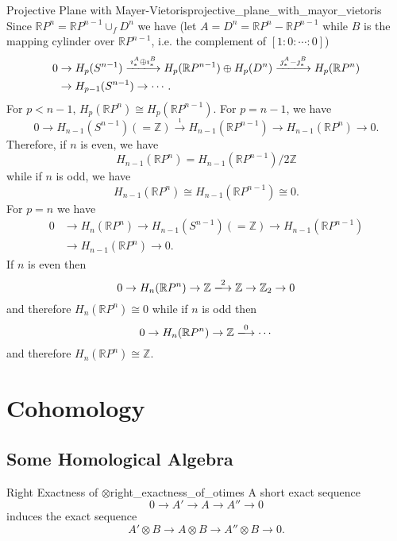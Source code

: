 \documentclass{article}
\begin{document}
\begin{example}{Projective Plane with Mayer-Vietoris}{projective_plane_with_mayor_vietoris}
    Since $\mathbb{R}P^n = \mathbb{R}P^{n-1} \cup_f D^n$ we have (let $A = D^n = \mathbb{R}P^n - \mathbb{R}P^{n-1}$ while $B$ is the mapping cylinder over $\mathbb{R}P^{n-1}$, i.e. the complement of $[1:0:\cdots:0]$)
    \begin{align*}
        0 &\rightarrow H_p(S^{n-1}) \xlongrightarrow{\imath^A_* \oplus \imath^B_*} H_p(\mathbb{R}P^{n-1}) \oplus H_p(D^n) \xlongrightarrow{\jmath^A_* - \jmath^B_*} H_p(\mathbb{R}P^n) \\
        & \rightarrow H_{p-1}(S^{n-1}) \rightarrow \cdots.
    \end{align*}
    For $p < n-1$, $H_p(\mathbb{R}P^n) \cong H_p(\mathbb{R}P^{n-1})$.
    For $p=n-1$, we have
    \[ 0 \rightarrow H_{n-1}(S^{n-1}) (=\mathbb{Z}) \xrightarrow{\imath} H_{n-1}(\mathbb{R}P^{n-1}) \rightarrow H_{n-1}(\mathbb{R}P^n) \rightarrow 0. \]
    Therefore, if $n$ is even, we have
    \[ H_{n-1}(\mathbb{R}P^n) = H_{n-1}(\mathbb{R}P^{n-1})/2\mathbb{Z} \]
    while if $n$ is odd, we have
    \[ H_{n-1}(\mathbb{R}P^n) \cong H_{n-1}(\mathbb{R}P^{n-1}) \cong 0. \]
    For $p=n$ we have
    \begin{align*}
        0 &\rightarrow H_n(\mathbb{R}P^n) \rightarrow H_{n-1}(S^{n-1})(=\mathbb{Z}) \rightarrow H_{n-1}(\mathbb{R}P^{n-1}) \\ &\rightarrow H_{n-1}(\mathbb{R}P^{n}) \rightarrow 0.
    \end{align*}
    If $n$ is even then
    \[ 0 \rightarrow H_n(\mathbb{R}P^n) \rightarrow \mathbb{Z} \xlongrightarrow{2} \mathbb{Z} \rightarrow \mathbb{Z}_2 \rightarrow 0 \]
    and therefore $H_n(\mathbb{R}P^n) \cong 0$ while if $n$ is odd then
    \[ 0 \rightarrow H_n(\mathbb{R}P^n) \rightarrow \mathbb{Z} \xlongrightarrow{0} \cdots \]
    and therefore $H_n(\mathbb{R}P^n) \cong \mathbb{Z}$.
\end{example}

\section{Cohomology}

\subsection{Some Homological Algebra}

\begin{proposition}{Right Exactness of $\otimes$}{right_exactness_of_otimes}
    A short exact sequence
    \[ 0 \longrightarrow A' \longrightarrow A \longrightarrow A'' \longrightarrow 0 \]
    induces the exact sequence
    \[ A'\otimes B \longrightarrow A\otimes B \longrightarrow A''\otimes B \longrightarrow 0. \]
\end{proposition}
\end{document}
